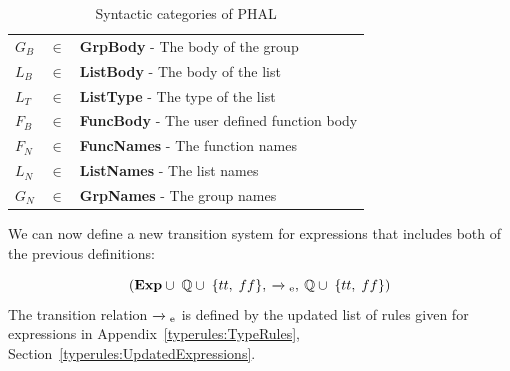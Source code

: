 \begin{table}[H]
\begin{tabular}{@{}lll@{}}
$G_B$       & $\in$ & \textbf{GrpBody} - The body of the group \\
$L_B$       & $\in$ & \textbf{ListBody} - The body of the list \\
$L_T$       & $\in$ & \textbf{ListType} - The type of the list \\
$F_B$      & $\in$ &  \textbf{FuncBody} - The user defined function body  \\ 
$F_N$      & $\in$ &  \textbf{FuncNames} - The function names  \\
$L_N$      & $\in$ &  \textbf{ListNames} - The list names  \\
$G_N$      & $\in$ &  \textbf{GrpNames} - The group names  \\\bottomrule
\end{tabular}
\caption{Syntactic categories of PHAL}
\label{tab:updatedsyntacticcategories}
\end{table}
\noindent 
We can now define a new transition system for expressions that includes both of the previous definitions:

\begin{equation*}
(\textbf{Exp} \cup \; \mathbb{Q} \cup \; \{tt, \; ff\}, \: \xrightarrow{}\textsubscript{e}, \: \mathbb{Q} \cup \; \{tt, \; ff\})    
\end{equation*}
The transition relation $\xrightarrow{}\textsubscript{e}$ is defined by the updated list of rules given for expressions in Appendix~\ref{typerules:TypeRules}, Section~\ref{typerules:UpdatedExpressions}.

